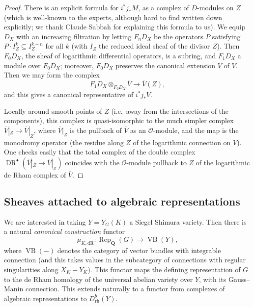 \documentclass[cjm]{ipart}
\theoremstyle{plain}
\theoremstyle{remark}
\DeclareMathOperator{\DR}{DR}
\newcommand{\QQ}{\mathbf{Q}}
\newcommand{\cO}{\mathcal{O}}
\newcommand{\dR}{\mathrm{dR}}
\numberwithin{equation}{subsection}
\begin{document}
  \begin{proof}
   There is an explicit formula for $i^* j_* M$, as a complex of $D$-modules on $Z$ (which is well-known to the experts, although hard to find written down explicitly; we thank Claude Sabbah for explaining this formula to us). We equip $D_X$ with an increasing filtration by letting $F_n D_X$ be the operators $P$ satisfying $P \cdot I_Z^k \subseteq I_Z^{k-n}$ for all $k$ (with $I_Z$ the reduced ideal sheaf of the divisor $Z$). Then $F_0 D_X$, the sheaf of logarithmic differential operators, is a subring, and $F_1 D_X$ a module over $F_0 D_X$; moreover, $F_0 D_X$ preserves the canonical extension $\overline{V}$ of $V$. Then we may form the complex
   \[ F_1 D_X \otimes_{F_0 D_X} \overline{V} \longrightarrow \overline{V}(Z), \]
   and this gives a canonical representative of $i^* j_* V$.

   Locally around smooth points of $Z$ (i.e.~away from the intersections of the components), this complex is quasi-isomorphic to the much simpler complex $\overline{V}|_{Z} \longrightarrow \overline{V}|_{Z}$, where $\overline{V}|_{Z}$ is the pullback of $\overline{V}$ as an $\cO$-module, and the map is the monodromy operator (the residue along $Z$ of the logarithmic connection on $V$). One checks easily that the total complex of the double complex $\DR^\bullet\left(\overline{V}|_{Z} \longrightarrow \overline{V}|_{Z}\right)$ coincides with the $\cO$-module pullback to $Z$ of the logarithmic de Rham complex of $\overline{V}$.
  \end{proof}

 \subsection{Sheaves attached to algebraic representations}

  We are interested in taking $Y = Y_G(K)$ a Siegel Shimura variety. Then there is a natural \emph{canonical construction} functor
  \[ \mu_{K, \dR} : \operatorname{Rep}_{\QQ}(G) \to \operatorname{VB}(Y), \]
  where $\operatorname{VB}(-)$ denotes the category of vector bundles with integrable connection (and this takes values in the subcategory of connections with regular singularities along $X_K - Y_K$). This functor maps the defining representation of $G$ to the de Rham homology of the universal abelian variety over $Y$, with its Gauss--Manin connection. This extends naturally to a functor from complexes of algebraic representations to $D^b_{\mathrm{rh}}(Y)$.
\end{document}
